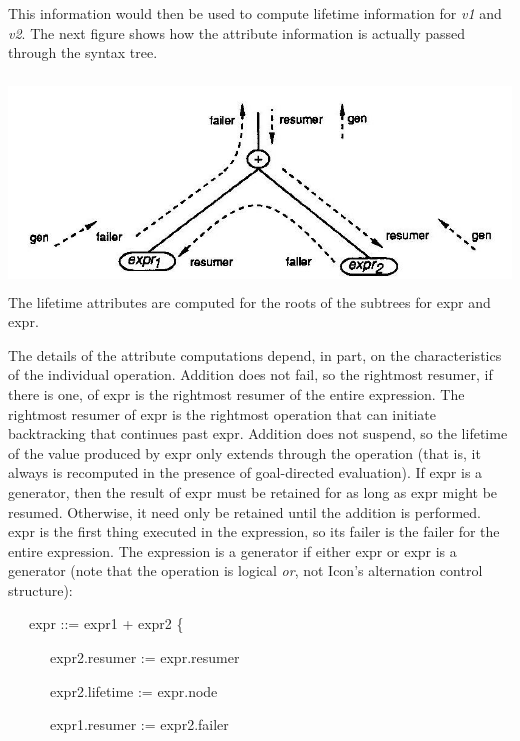 This information would then be used to compute lifetime information
for \textit{v1} and \textit{v2}. The next figure shows how the
attribute information is actually passed through the syntax tree.


 \includegraphics[width=6.0in,height=2.2in]{kw/figure4-6.png}  
The lifetime attributes are computed for the roots of the subtrees for expr and expr.


The details of the attribute computations depend, in part, on the
characteristics of the individual operation. Addition does not fail,
so the rightmost resumer, if there is one, of expr is
the rightmost resumer of the entire expression. The rightmost resumer
of expr is the rightmost operation that can initiate
backtracking that continues past expr. Addition does
not suspend, so the lifetime of the value produced by
expr only extends through the operation (that is, it
always is recomputed in the presence of goal-directed evaluation). If
expr is a generator, then the result of
expr must be retained for as long as
expr might be resumed. Otherwise, it need only be
retained until the addition is performed. expr is the
first thing executed in the expression, so its failer is the failer
for the entire expression. The expression is a generator if either
expr or expr is a generator (note
that the operation {\textbar} is logical \textit{or}, not Icon's
alternation control structure):

{\ttfamily\mdseries
\ \ \ expr ::= expr1 + expr2 \{}

{\ttfamily\mdseries
\ \ \ \ \ \ expr2.resumer := expr.resumer}

{\ttfamily\mdseries
\ \ \ \ \ \ expr2.lifetime := expr.node}

{\ttfamily\mdseries
\ \ \ \ \ \ expr1.resumer := expr2.failer}

